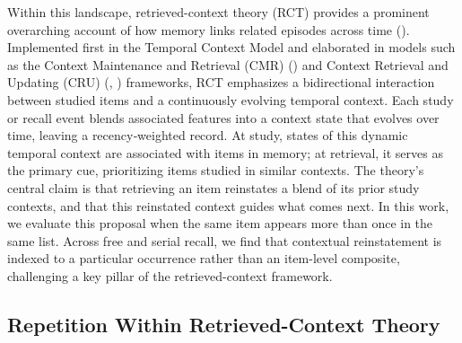 \documentclass[
  man,
  floatsintext,
  longtable,
  nolmodern,
  notxfonts,
  notimes,
  draftfirst,
  colorlinks=true,linkcolor=blue,citecolor=blue,urlcolor=blue]{apa7}
\begin{document}
Within this landscape, retrieved-context theory (RCT) provides a
prominent overarching account of how memory links related episodes
across time (). Implemented first in the Temporal Context Model and elaborated
in models such as the Context Maintenance and Retrieval (CMR)
() and Context
Retrieval and Updating (CRU) (, ) frameworks, RCT emphasizes
a bidirectional interaction between studied items and a continuously
evolving temporal context. Each study or recall event blends associated
features into a context state that evolves over time, leaving a
recency‑weighted record. At study, states of this dynamic temporal
context are associated with items in memory; at retrieval, it serves as
the primary cue, prioritizing items studied in similar contexts. The
theory's central claim is that retrieving an item reinstates a blend of
its prior study contexts, and that this reinstated context guides what
comes next. In this work, we evaluate this proposal when the same item
appears more than once in the same list. Across free and serial recall,
we find that contextual reinstatement is indexed to a particular
occurrence rather than an item-level composite, challenging a key pillar
of the retrieved-context framework.

\subsection{Repetition Within Retrieved-Context
Theory}\label{repetition-within-retrieved-context-theory}
\end{document}
